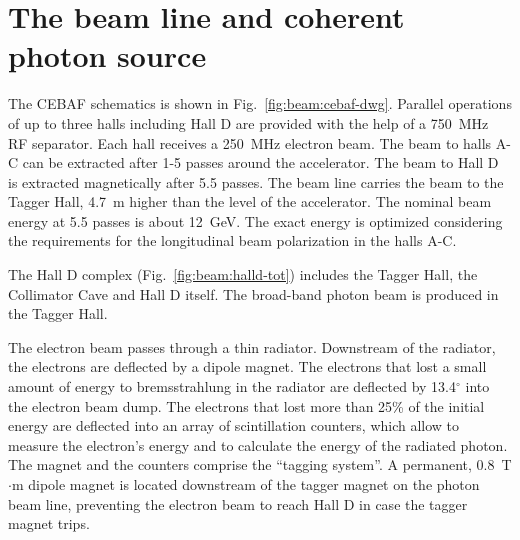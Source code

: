 
\section[The beam line and coherent photon source (TCR/Stuart)]{The beam line and coherent photon source \label{sec:beamline}}

The CEBAF schematics is shown in Fig.~\ref{fig:beam:cebaf-dwg}.
Parallel operations of up to three halls including Hall D are provided
with the help of a 750~MHz RF separator. Each hall receives a 250~MHz
electron beam. The beam to halls A-C can be extracted after 1-5 passes
around the accelerator. The beam to Hall D is extracted magnetically
after 5.5 passes. The beam line carries the beam to the Tagger Hall,
4.7~m higher than the level of the accelerator.  The nominal beam
energy at 5.5 passes is about 12~GeV. The exact energy is optimized
considering the requirements for the longitudinal beam polarization in
the halls A-C.

The Hall D complex (Fig.~\ref{fig:beam:halld-tot}) includes the Tagger
Hall, the Collimator Cave and Hall D itself. The broad-band photon
beam is produced in the Tagger Hall.

The electron beam passes through a thin radiator. Downstream of the
radiator, the electrons are deflected by a dipole magnet. The
electrons that lost a small amount of energy to bremsstrahlung in the
radiator are deflected by 13.4$^\circ$ into the electron beam dump.
The electrons that lost more than 25\% of the initial energy are
deflected into an array of scintillation counters, which allow to
measure the electron's energy and to calculate the energy of the
radiated photon. The magnet and the counters comprise the ``tagging
system''. A permanent, 0.8~T$\cdot$m dipole magnet is located
downstream of the tagger magnet on the photon beam line, preventing
the electron beam to reach Hall D in case the tagger magnet trips.

